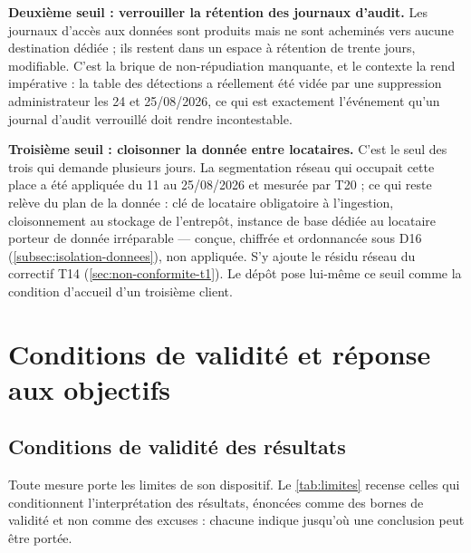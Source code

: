 \textbf{Deuxième seuil : verrouiller la rétention des journaux d'audit.} Les journaux d'accès aux
données sont produits mais ne sont acheminés vers aucune destination dédiée ; ils restent dans un
espace à rétention de trente jours, modifiable. C'est la brique de non-répudiation manquante, et
le contexte la rend impérative : la table des détections a réellement été vidée par une
suppression administrateur les 24 et 25/08/2026, ce qui est exactement l'événement qu'un journal
d'audit verrouillé doit rendre incontestable.

\textbf{Troisième seuil : cloisonner la donnée entre locataires.} C'est le seul des trois qui
demande plusieurs jours. La segmentation réseau qui occupait cette place a été appliquée du 11 au
25/08/2026 et mesurée par T20 ; ce qui reste relève du plan de la donnée : clé de locataire
obligatoire à l'ingestion, cloisonnement au stockage de l'entrepôt, instance de base dédiée au
locataire porteur de donnée irréparable --- conçue, chiffrée et ordonnancée sous D16
(\cref{subsec:isolation-donnees}), non appliquée. S'y ajoute le résidu réseau du correctif T14
(\cref{sec:non-conformite-t1}). Le dépôt pose lui-même ce seuil comme la condition d'accueil d'un
troisième client.

\section{Conditions de validité et réponse aux objectifs}
\label{sec:cloture}

\subsection{Conditions de validité des résultats}
\label{sec:limites}

Toute mesure porte les limites de son dispositif. Le \cref{tab:limites} recense celles qui
conditionnent l'interprétation des résultats, énoncées comme des bornes de validité et non comme
des excuses : chacune indique jusqu'où une conclusion peut être portée.


